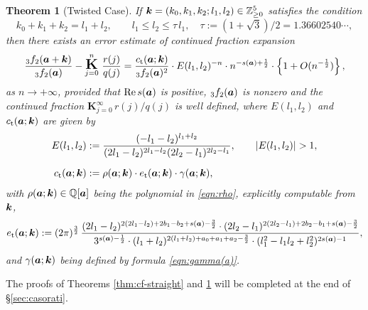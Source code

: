 \documentclass[a4paper,12pt]{article}
\theoremstyle{plain}
\newtheorem{theorem}{Theorem}[section]
\def\rt{\mathrm{t}}
\def\rRe{\mathrm{Re}}
\def\Q{\mathbb{Q}}
\def\Z{\mathbb{Z}}
\def\ba{\mbox{\boldmath $a$}}
\def\sba{\mbox{\boldmath ${\scriptstyle a}$}}
\def\bk{\mbox{\boldmath $k$}}
\def\cfL{\mbox{\Large \boldmath $\mathrm{K}$}}
\begin{document}
\begin{theorem}[Twisted Case] \label{thm:cf-cyclic} 
If $\bk = (k_0, k_1, k_2; l_1, l_2) \in \Z^5_{\ge0}$ satisfies the condition   
\begin{equation} \label{eqn:cond-cyclic}
k_0+k_1+k_2 = l_1 + l_2, \qquad
l_1 \le l_2 \le \tau \, l_1,  \quad 
 \tau := (1+ \sqrt{3})/2 = 1.36602540\cdots, 
\end{equation} 
then there exists an error estimate of continued fraction expansion  
\begin{equation} \label{eqn:cf-cyclic}
\frac{{}_3f_2(\ba+\bk)}{{}_3f_2(\ba)} - 
\overset{n}{\underset{j=0}{\cfL}} \,\, \frac{r(j)}{q(j)} 
= \dfrac{c_{\rt}(\ba; \bk)}{{}_3f_2(\ba)^2}  
\cdot E(l_1, l_2)^{-n} \cdot n^{-s(\sba) + \frac{1}{2} } \cdot 
\left\{ 1 + O (n^{-\frac{1}{2} } ) \right\}, 
\end{equation}
as $n \to +\infty$, provided that $\rRe \, s(\ba)$ is positive, ${}_3f_2(\ba)$ is 
nonzero and the continued fraction $\mathbf{K}_{j=0}^{\infty} \, r(j)/q(j)$ 
is well defined,  where $E(l_1, l_2)$ and $c_{\rt}(\ba; \bk)$ are given by 
\begin{align}
E(l_1, l_2) 
&:= \dfrac{(-l_1 - l_2)^{l_1 + l_2}}{(2 l_1 - l_2)^{2 l_1 - l_2} (2 l_2 - l_1)^{2 l_2 - l_1}}, 
\qquad |E(l_1, l_2)| > 1,  \label{eqn:A(l1,l2)} \\[2mm] 
c_{\rt}(\ba; \bk) &:= \rho(\ba; \bk) \cdot e_{\rt}(\ba; \bk) \cdot 
\gamma(\ba; \bk),  \nonumber
\end{align} 
with $\rho(\ba; \bk) \in \Q[\ba]$ being the polynomial in 
\eqref{eqn:rho}, explicitly computable from $\bk$,  
\begin{equation}  \label{eqn:ec(a;k)} 
e_{\rt}(\ba; \bk) 
:= (2 \pi)^{ \frac{3}{2} } \, 
\dfrac{ (2l_1-l_2)^{2(2 l_1-l_2) + 2 b_1-b_2+s(\sba)- \frac{3}{2} } \cdot 
 (2l_2-l_1)^{2(2 l_2-l_1) + 2 b_2-b_1 + s(\sba)- \frac{3}{2} } }{ 3^{s(\sba) -\frac{1}{2} } 
\cdot 
 (l_1+l_2)^{2(l_1+l_2) +a_0+a_1+a_2- \frac{3}{2} } \cdot 
(l_1^2 -l_1 l_2 + l_2^2)^{2 s(\sba)-1}},  
\end{equation}
and $\gamma(\ba; \bk)$ being defined by formula \eqref{eqn:gamma(a)}. 
\end{theorem}
\par
The proofs of Theorems \ref{thm:cf-straight} and \ref{thm:cf-cyclic} will be 
completed at the end of \S \ref{sec:casorati}. 
\end{document}
